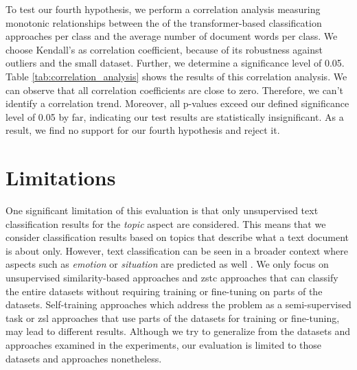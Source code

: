 \documentclass[sigconf]{acmart}
\begin{document}
To test our fourth hypothesis, we perform a correlation analysis measuring monotonic relationships between the  of the transformer-based classification approaches per class and the average number of document words per class. We choose Kendall's  as correlation coefficient, because of its robustness against outliers and the small dataset. Further, we determine a significance level of 0.05. Table \ref{tab:correlation_analysis} shows the results of this correlation analysis. We can observe that all correlation coefficients are close to zero. Therefore, we can't identify a correlation trend. Moreover, all p-values exceed our defined significance level of 0.05 by far, indicating our test results are statistically insignificant. As a result, we find no support for our fourth hypothesis and reject it.

\section{Limitations}
One significant limitation of this evaluation is that only unsupervised text classification results for the \textit{topic} aspect are considered. This means that we consider classification results based on topics that describe what a text document is about only. However, text classification can be seen in a broader context where aspects such as \textit{emotion} or \textit{situation} are predicted as well \cite{yin-etal-2019-benchmarking}. We only focus on unsupervised similarity-based approaches and \ac{zstc} approaches that can classify the entire datasets without requiring training or fine-tuning on parts of the datasets. Self-training approaches which address the problem as a semi-supervised task or \ac{zsl} approaches that use parts of the datasets for training or fine-tuning, may lead to different results. Although we try to generalize from the datasets and approaches examined in the experiments, our evaluation is limited to those datasets and approaches nonetheless.
\end{document}
